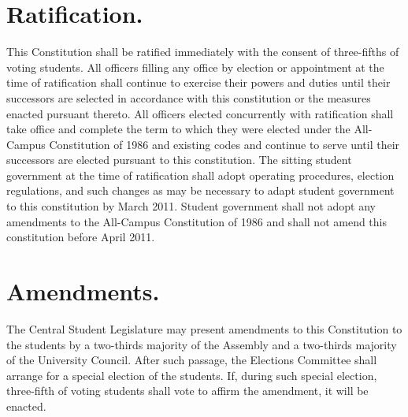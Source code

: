 \section{Ratification.}
    This Constitution shall be ratified immediately with the consent of three-fifths of voting students. All officers filling any office by election or appointment at the time of ratification shall continue to exercise their powers and duties until their successors are selected in accordance with this constitution or the measures enacted pursuant thereto. All officers elected concurrently with ratification shall take office and complete the term to which they were elected under the All-Campus Constitution of 1986 and existing codes and continue to serve until their successors are elected pursuant to this constitution. The sitting student government at the time of ratification shall adopt operating procedures, election regulations, and such changes as may be necessary to adapt student government to this constitution by March 2011. Student government shall not adopt any amendments to the All-Campus Constitution of 1986 and shall not amend this constitution before April 2011.

\section{Amendments.}
    The Central Student Legislature may present amendments to this Constitution to the students by a two-thirds majority of the Assembly and a two-thirds majority of the University Council. After such passage, the Elections Committee shall arrange for a special election of the students. If, during such special election, three-fifth of voting students shall vote to affirm the amendment, it will be enacted.